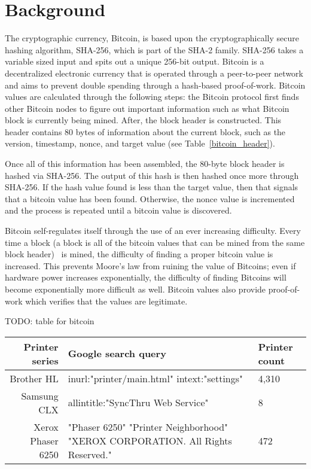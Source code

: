 \section{Background}

The cryptographic currency, Bitcoin, is based upon the cryptographically secure hashing algorithm, SHA-256, which is part of the SHA-2 family.
SHA-256 takes a variable sized input and spits out a unique 256-bit output.
Bitcoin is a decentralized electronic currency that is operated through a peer-to-peer network and aims to prevent double spending through a hash-based proof-of-work.
Bitcoin values are calculated through the following steps: the Bitcoin protocol first finds other Bitcoin nodes to figure out important information such as what Bitcoin block is currently being mined.
After, the block header is constructed.
This header contains 80 bytes of information about the current block, such as the version, timestamp, nonce, and target value (see Table~\ref{bitcoin_header}).

Once all of this information has been assembled, the 80-byte block header is hashed via SHA-256.
The output of this hash is then hashed once more through SHA-256.
If the hash value found is less than the target value, then that signals that a bitcoin value has been found.
Otherwise, the nonce value is incremented and the process is repeated until a bitcoin value is discovered.

Bitcoin self-regulates itself through the use of an ever increasing difficulty.
Every time a block (a block is all of the bitcoin values that can be mined from the same block header)  is mined, the difficulty of finding a proper bitcoin value is increased.
This prevents Moore’s law from ruining the value of Bitcoins; even if hardware power increases exponentially, the difficulty of finding Bitcoins will become exponentially more difficult as well.
Bitcoin values also provide proof-of-work which verifies that the values are legitimate.

\begin{table}
\label{bitcoin_header}
TODO: table for bitcoin
\end{table}



\begin{table}
\label{printer_dorks}
\begin{tabular}{r| l | l}
    \hline
    \hline
    {\bf Printer series} & {\bf Google search query} & {\bf Printer count} \\
    \hline
    Brother HL & inurl:"printer/main.html" intext:"settings" & 4,310 \\
    Samsung CLX & allintitle:"SyncThru Web Service" & 8 \\
    Xerox Phaser 6250 & "Phaser 6250" "Printer Neighborhood" "XEROX CORPORATION. All Rights Reserved." & 472 \\

    \hline
\end{tabular}
\end{table}
